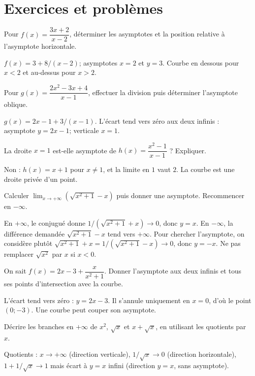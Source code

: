 \section{Exercices et problèmes}
\exo[Horizontale]\label{t11s-c03-e01}
Pour $f(x)=\dfrac{3x+2}{x-2}$, déterminer les asymptotes et la position relative à l’asymptote horizontale.
\begin{corrige}\label{sol-t11s-c03-e01}
$f(x)=3+8/(x-2)$; asymptotes $x=2$ et $y=3$. Courbe en dessous pour $x<2$ et au-dessus pour $x>2$.
\end{corrige}
\exo[Division]\label{t11s-c03-e02}
Pour $g(x)=\dfrac{2x^2-3x+4}{x-1}$, effectuer la division puis déterminer l’asymptote oblique.
\begin{corrige}\label{sol-t11s-c03-e02}
$g(x)=2x-1+3/(x-1)$. L’écart tend vers zéro aux deux infinis : asymptote $y=2x-1$; verticale $x=1$.
\end{corrige}
\label{t11s-c03-e03}
La droite $x=1$ est-elle asymptote de $h(x)=\dfrac{x^2-1}{x-1}$ ? Expliquer.
\begin{corrige}\label{sol-t11s-c03-e03}
Non : $h(x)=x+1$ pour $x\ne1$, et la limite en $1$ vaut $2$. La courbe est une droite privée d’un point.
\end{corrige}
\label{t11s-c03-e04}
Calculer $\lim_{x\to+\infty}(\sqrt{x^2+1}-x)$ puis donner une asymptote. Recommencer en $-\infty$.
\begin{corrige}\label{sol-t11s-c03-e04}
En $+\infty$, le conjugué donne $1/(\sqrt{x^2+1}+x)\to0$, donc $y=x$. En $-\infty$, la différence demandée $\sqrt{x^2+1}-x$ tend vers $+\infty$. Pour chercher l’asymptote, on considère plutôt $\sqrt{x^2+1}+x=1/(\sqrt{x^2+1}-x)\to0$, donc $y=-x$. Ne pas remplacer $\sqrt{x^2}$ par $x$ si $x<0$.
\end{corrige}
\label{t11s-c03-e05}
On sait $f(x)=2x-3+\dfrac{x}{x^2+1}$. Donner l’asymptote aux deux infinis et tous ses points d’intersection avec la courbe.
\begin{corrige}\label{sol-t11s-c03-e05}
L’écart tend vers zéro : $y=2x-3$. Il s’annule uniquement en $x=0$, d’où le point $(0;-3)$. Une courbe peut couper son asymptote.
\end{corrige}
\exo[Classer]\label{t11s-c03-e06}
Décrire les branches en $+\infty$ de $x^2$, $\sqrt{x}$ et $x+\sqrt{x}$, en utilisant les quotients par $x$.
\begin{corrige}\label{sol-t11s-c03-e06}
Quotients : $x\to+\infty$ (direction verticale), $1/\sqrt x\to0$ (direction horizontale), $1+1/\sqrt x\to1$ mais écart à $y=x$ infini (direction $y=x$, sans asymptote).
\end{corrige}

